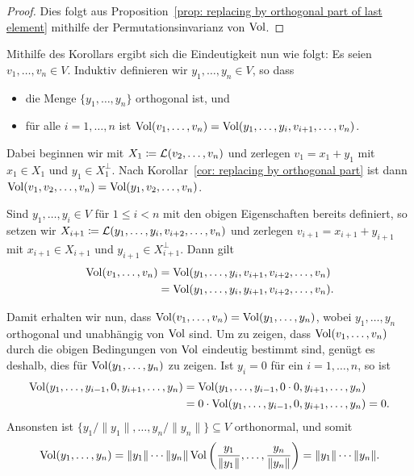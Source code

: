 \documentclass[a4paper, 10pt]{scrartcl}
\begin{document}
\begin{proof}
  Dies folgt aus Proposition~\ref{prop: replacing by orthogonal part of last element} mithilfe der Permutationsinvarianz von $\operatorname{Vol}$.
\end{proof}


Mithilfe des Korollars ergibt sich die Eindeutigkeit nun wie folgt:
Es seien $v_1, \dotsc, v_n \in V$.
Induktiv definieren wir $y_1, \dotsc, y_n \in V$, so dass
\begin{itemize}
  \item
    die Menge $\{y_1, \dotsc, y_n\}$ orthogonal ist, und
  \item
    für alle $i = 1, \dotsc, n$ ist $\operatorname{Vol}(v_1, \dotsc, v_n) = \operatorname{Vol}(y_1, \dotsc, y_i, v_{i+1}, \dotsc, v_n)$.
\end{itemize}

Dabei beginnen wir mit $X_1 \coloneqq \operatorname{\mathcal{L}}(v_2, \dotsc, v_n)$ und zerlegen $v_1 = x_1 + y_1$ mit $x_1 \in X_1$ und $y_1 \in X_1^\perp$.
Nach Korollar~\ref{cor: replacing by orthogonal part} ist dann $\operatorname{Vol}(v_1, v_2, \dotsc, v_n) = \operatorname{Vol}(y_1, v_2, \dotsc, v_n)$.

Sind $y_1, \dotsc, y_i \in V$ für $1 \leq i < n$ mit den obigen Eigenschaften bereits definiert, so setzen wir $X_{i+1} \coloneqq \operatorname{\mathcal{L}}(y_1, \dotsc, y_i, v_{i+2}, \dotsc, v_n)$ und zerlegen $v_{i+1} = x_{i+1} + y_{i+1}$ mit $x_{i+1} \in X_{i+1}$ und $y_{i+1} \in X_{i+1}^\perp$.
Dann gilt
\begin{align*}
      \operatorname{Vol}(v_1, \dotsc, v_n)
  &=  \operatorname{Vol}(y_1, \dotsc, y_i, v_{i+1}, v_{i+2}, \dotsc, v_n) \\
  &=  \operatorname{Vol}(y_1, \dotsc, y_i, y_{i+1}, v_{i+2}, \dotsc, v_n).
\end{align*}

Damit erhalten wir nun, dass $\operatorname{Vol}(v_1, \dotsc, v_n) = \operatorname{Vol}(y_1, \dotsc, y_n)$, wobei $y_1, \dotsc, y_n$ orthogonal und unabhängig von $\operatorname{Vol}$ sind.
Um zu zeigen, dass $\operatorname{Vol}(v_1, \dotsc, v_n)$ durch die obigen Bedingungen von $\operatorname{Vol}$ eindeutig bestimmt sind, genügt es deshalb, dies für $\operatorname{Vol}(y_1, \dotsc, y_n)$ zu zeigen.
Ist $y_i = 0$ für ein $i = 1, \dotsc, n$, so ist
\begin{align*}
      \operatorname{Vol}(y_1, \dotsc, y_{i-1}, 0, y_{i+1}, \dotsc, y_n)
  &=  \operatorname{Vol}(y_1, \dotsc, y_{i-1}, 0 \cdot 0, y_{i+1}, \dotsc, y_n) \\
  &=  0 \cdot \operatorname{Vol}(y_1, \dotsc, y_{i-1}, 0, y_{i+1}, \dotsc, y_n)
   =  0.
\end{align*}
Ansonsten ist $\{ y_1/\|y_1\|, \dotsc, y_n/\|y_n\| \} \subseteq V$ orthonormal, und somit
\[
    \operatorname{Vol}(y_1, \dotsc, y_n)
  = \|y_1\| \dotsm \|y_n\| \operatorname{Vol}\left( \frac{y_1}{\|y_1\|}, \dotsc, \frac{y_n}{\|y_n\|} \right)
  = \|y_1\| \dotsm \|y_n\|.
\]
\end{document}
